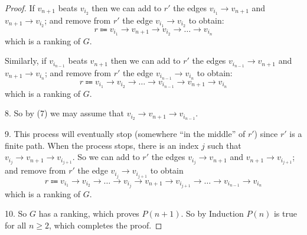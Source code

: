 \documentclass[14pt]{extarticle}
\begin{document}
\begin{proof}
If $v_{n+1}$ beats $v_{i_2}$ then we can add to $r'$ the edges $v_{i_1} \to v_{n+1}$ and $v_{n+1} \to v_{i_2}$; and remove from $r'$ the edge $v_{i_1} \to v_{i_2}$ to obtain:
$$
r \Coloneqq v_{i_1} \to v_{n+1} \to v_{i_2} \to \ldots \to v_{i_n}
$$
which is a ranking of $G$.

Similarly, if $v_{i_{n-1}}$ beats $v_{n+1}$ then we can add to $r'$ the edges $v_{i_{n-1}} \to v_{n+1}$ and $v_{n+1} \to v_{i_n}$; and remove from $r'$ the edge $v_{i_{n-1}} \to v_{i_n}$ to obtain:
$$
r \Coloneqq v_{i_1} \to v_{i_2} \to \ldots \to v_{i_{n-1}} \to v_{n+1} \to v_{i_n}
$$
which is a ranking of $G$.

8. So by (7) we may assume that $v_{i_2} \to v_{n+1} \to v_{i_{n-1}}$.

9. This process will eventually stop (somewhere ``in the middle'' of $r'$) since $r'$ is a finite path. When the process stops, there is an index $j$ such that $v_{i_j} \to v_{n+1} \to v_{i_{j+1}}$. So we can add to $r'$ the edges $v_{i_j} \to v_{n+1}$ and $v_{n+1} \to v_{i_{j+1}}$; and remove from $r'$ the edge $v_{i_j} \to v_{i_{j+1}}$ to obtain
$$
r \Coloneqq v_{i_1} \to v_{i_2} \to \ldots \to v_{i_{j}} \to v_{n+1} \to v_{i_{j+1}} \to \ldots \to v_{i_{n-1}} \to v_{i_n}
$$
which is a ranking of $G$.

10. So $G$ has a ranking, which proves $P(n+1)$. So by Induction $P(n)$ is true for all $n \geq 2$, which completes the proof.
\end{proof}
\end{document}

